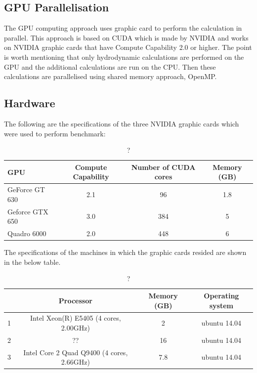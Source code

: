 \documentclass[paper=a4, fontsize=11pt]{scrartcl}
\numberwithin{equation}{section}		%
\numberwithin{figure}{section}			%
\numberwithin{table}{section}				%
\begin{document}
\subsection{GPU Parallelisation}
The GPU computing approach uses graphic card to perform the calculation in parallel. This approach is based on CUDA which is made by NVIDIA and works on NVIDIA graphic cards that have Compute Capability 2.0 or higher. The point is worth mentioning that only hydrodynamic calculations are performed on the GPU and the additional calculations are run on the CPU. Then these calculations are parallelised using shared memory approach, OpenMP.

\subsection{Hardware}
The following are the specifications of the three NVIDIA graphic cards which were used to perform benchmark:\\

\begin{table}[!h]
\caption{?}
\centering
\begin{tabular}{|l| c| c| c|}
	\hline
	GPU & Compute Capability & Number of CUDA cores & Memory (GB)\\
	\hline
    GeForce GT 630 & 2.1 & 96 & 1.8  \\
	\hline
    Geforce GTX 650 & 3.0 & 384 & 5 \\
	\hline
    Quadro 6000 & 2.0 & 448 & 6 \\
	\hline
\end{tabular}
\label{table1}
\end{table}

The specifications of the machines in which the graphic cards resided are shown in the below table.

\begin{table}[!h]
\caption{?}
\centering
\begin{tabular}{| c| c| c| c|}
	\hline
	  & Processor & Memory (GB)& Operating system\\
	\hline
    1  & Intel Xeon(R) E5405 (4 cores, 2.00GHz) & 2& ubuntu 14.04 \\
	\hline
    2  & ?? & 16 & ubuntu 14.04 \\
	\hline
    3  & Intel Core 2 Quad Q9400 (4 cores, 2.66GHz) & 7.8& ubuntu 14.04 \\
	\hline
\end{tabular}
\label{table2}
\end{table}
\end{document}

